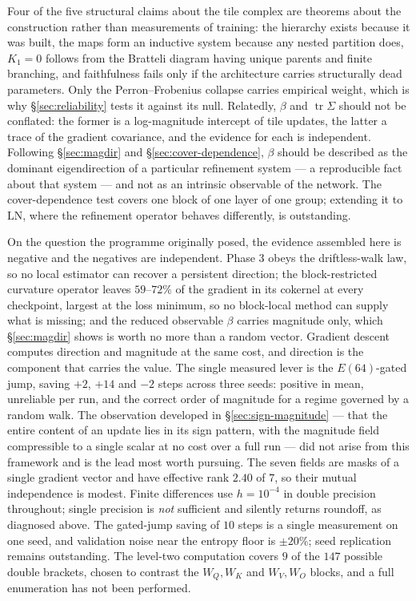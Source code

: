 Four of the five structural claims about the tile complex are theorems about
the construction rather than measurements of training: the hierarchy exists
because it was built, the maps form an inductive system because any nested
partition does, $K_1=0$ follows from the Bratteli diagram having unique parents
and finite branching, and faithfulness fails only if the architecture carries
structurally dead parameters. Only the Perron--Frobenius collapse carries
empirical weight, which is why \S\ref{sec:reliability} tests it against its
null. Relatedly, $\beta$ and $\operatorname{tr}\Sigma$ should not be conflated:
the former is a log-magnitude intercept of tile updates, the latter a trace of
the gradient covariance, and the evidence for each is independent. Following
\S\ref{sec:magdir} and \S\ref{sec:cover-dependence}, $\beta$ should be
described as the dominant eigendirection of a particular refinement system --- a
reproducible fact about that system --- and not as an intrinsic observable of
the network. The cover-dependence test covers one block of one layer of one
group; extending it to $\mathrm{LN}$, where the refinement operator behaves
differently, is outstanding.

On the question the programme originally posed, the evidence assembled here is
negative and the negatives are independent. Phase 3 obeys the driftless-walk
law, so no local estimator can recover a persistent direction; the
block-restricted curvature operator leaves $59$--$72\%$ of the gradient in its
cokernel at every checkpoint, largest at the loss minimum, so no block-local
method can supply what is missing; and the reduced observable $\beta$ carries
magnitude only, which \S\ref{sec:magdir} shows is worth no more than a random
vector. Gradient descent computes direction and magnitude at the same cost, and
direction is the component that carries the value. The single measured lever is
the $E(64)$-gated jump, saving $+2$, $+14$ and $-2$ steps across three seeds:
positive in mean, unreliable per run, and the correct order of magnitude for a
regime governed by a random walk. The observation developed in \S\ref{sec:sign-magnitude} --- that the entire
content of an update lies in its sign pattern, with the magnitude field
compressible to a single scalar at no cost over a full run --- did not arise
from this framework and is the lead most worth pursuing.
The seven fields are masks of a single gradient vector and have effective rank
$2.40$ of $7$, so their mutual independence is modest. Finite differences use
$h=10^{-4}$ in double precision throughout; single precision is \emph{not}
sufficient and silently returns roundoff, as diagnosed above. The gated-jump
saving of $10$ steps is a single measurement on one seed, and validation noise
near the entropy floor is $\pm 20\%$; seed replication remains outstanding.
The level-two computation covers $9$ of the $147$ possible double brackets,
chosen to contrast the $W_Q,W_K$ and $W_V,W_O$ blocks, and a full enumeration
has not been performed.

